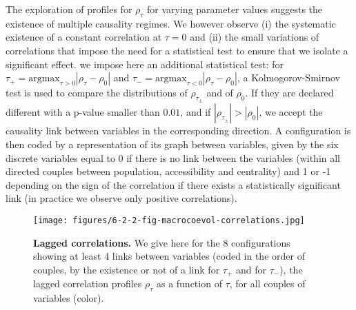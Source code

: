 The exploration of profiles for $\rho_\tau$ for varying parameter values suggests the existence of multiple causality regimes. We however observe (i) the systematic existence of a constant correlation at $\tau = 0$ and (ii) the small variations of correlations that impose the need for a statistical test to ensure that we isolate a significant effect.  we  impose here  an additional statistical test: for $\tau_+ = \textrm{argmax}_{\tau>0} \left|\rho_{\tau} - \rho_0\right|$ and $\tau_- = \textrm{argmax}_{\tau<0} \left|\rho_{\tau} - \rho_0\right|$, a Kolmogorov-Smirnov test is used to compare the distributions of $\rho_{\tau_{\pm}}$ and of $\rho_0$. If they are declared different with a p-value smaller than $0.01$, and if $\left|\rho_{\tau_{\pm}}\right| > \left|\rho_0\right|$, we accept the causality link between variables in the corresponding direction. A configuration is then coded by a representation of its graph between variables, given by the six discrete variables equal to 0 if there is no link between the variables (within all directed couples between population, accessibility and centrality) and 1 or -1 depending on the sign of the correlation if there exists a statistically significant link (in practice we observe only positive correlations).






\begin{figure}
	\texttt{[image: figures/6-2-2-fig-macrocoevol-correlations.jpg]}
\caption{\textbf{Lagged correlations.} We give here for the 8 configurations showing at least 4 links between variables (coded in the order of couples, by the existence or not of a link for $\tau_+$ and for $\tau_-$), the lagged correlation profiles $\rho_{\tau}$ as a function of $\tau$, for all couples of variables (color).\label{fig:macrocoevol:correlations}}
\end{figure}


